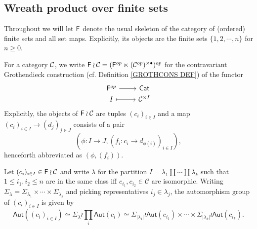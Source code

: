 \documentclass[a4paper,10pt]{article}%
\begin{document}
\subsection{Wreath product over finite sets}
\label{WREATH SEC}

Throughout we will let $\mathsf{F}$ denote the usual skeleton of the category of (ordered) finite sets and all set maps. Explicitly, its objects are the finite sets $\{1,2,\cdots,n\}$ for $n\geq 0$.


\begin{definition}
	For a category $\mathcal{C}$, we write 
	$\mathsf{F} \wr \mathcal{C} = (\mathsf{F}^{op} \ltimes (\mathcal{C}^{op})^{\times \bullet})^{op}$ 
	for the contravariant Grothendieck construction (cf. Definition \ref{GROTHCONS DEF}) of the functor
\[
\begin{tikzcd}[row sep=0pt]
	\Fin^{op} \ar{r} & \mathsf{Cat}
\\
	I \ar[r,mapsto] & \C^{\times I}
\end{tikzcd}	
 \]
Explicitly, the objects of $\mathsf{F} \wr \mathcal{C}$ are tuples $(c_i)_{i \in I}$ and a map 
$(c_i)_{i \in I} \to (d_j)_{j \in J}$ consists of a pair 
\[(\phi \colon I \to J, (f_i\colon c_i \to d_{\phi(i)})_{i\in I}),\]
 henceforth abbreviated as $(\phi,(f_i))$.
\end{definition}


\begin{remark}\label{WREATHFIXED REM}
Let $(c_i)_{i \in I} \in \mathsf{F} \wr \mathcal{C}$
and write $\lambda$ for the partition 
$I = \lambda_1 \amalg \cdots \amalg \lambda_k$
such that $1 \leq i_1, i_2 \leq n$ are in the same class iff
$c_{i_1}, c_{i_2} \in \mathcal{C}$ are isomorphic.
 Writing 
 $\Sigma_{\lambda} = \Sigma_{\lambda_1} \times \cdots \times
 \Sigma_{\lambda_k}$
and picking representatives $i_j \in \lambda_j$,
the automorphism group of  
$(c_i)_{i \in I}$ is given by
\begin{equation}
	\mathsf{Aut}\left( (c_i)_{i \in I} \right)
\simeq
	\Sigma_{\lambda} \wr \prod_{i} \mathsf{Aut}(c_i)
\simeq
	\Sigma_{|\lambda_1|} \wr 
	\mathsf{Aut}(c_{i_1})
		\times \cdots \times	
	\Sigma_{|\lambda_k|} \wr 
	\mathsf{Aut}(c_{i_k}).
\end{equation}
\end{remark}
\end{document}
